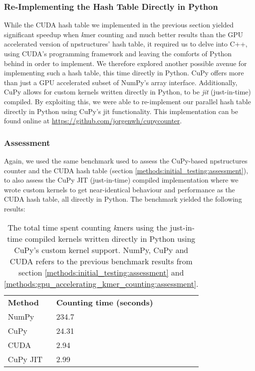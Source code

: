 \subsubsection{Re-Implementing the Hash Table Directly in Python} \label{methods:gpu_accelerating_kmer_counting_jit}
While the CUDA hash table we implemented in the previous section yielded significant speedup when \textit{k}mer counting and much better results than the GPU accelerated version of npstructures' hash table, it required us to delve into C++, using CUDA's programming framework and leaving the comforts of Python behind in order to implement.
We therefore explored another possible avenue for implementing such a hash table, this time directly in Python.
CuPy offers more than just a GPU accelerated subset of NumPy's array interface.
Additionally, CuPy allows for custom kernels written directly in Python, to be \textit{jit} (just-in-time) compiled.
By exploiting this, we were able to re-implement our parallel hash table directly in Python using CuPy's jit functionality.
This implementation can be found online at \url{https://github.com/jorgenwh/cupycounter}.

\subsubsection{Assessment}
Again, we used the same benchmark used to assess the CuPy-based npstructures counter and the CUDA hash table (section \ref{methods:initial_testing:assessment}), to also assess the CuPy JIT (just-in-time) compiled implementation where we wrote custom kernels to get near-identical behaviour and performance as the CUDA hash table, all directly in Python.
The benchmark yielded the following results:
\begin{table}[H]
\begin{center}
\begin{tabular}{lllll}
\multicolumn{1}{l|}{\textbf{Method}} & \multicolumn{1}{l}{\textbf{Counting time (seconds)}} &  \\ \cline{1-2}
\multicolumn{1}{l|}{NumPy} & \multicolumn{1}{l}{234.7} &  \\
\multicolumn{1}{l|}{CuPy} & \multicolumn{1}{l}{24.31} &  \\
\multicolumn{1}{l|}{CUDA} & \multicolumn{1}{l}{2.94} &  \\
\multicolumn{1}{l|}{CuPy JIT} & \multicolumn{1}{l}{2.99} &  \\
\end{tabular}
\end{center}
\caption{
  The total time spent counting \textit{k}mers using the just-in-time compiled kernels written directly in Python using CuPy's custom kernel support.
  NumPy, CuPy and CUDA refers to the previous benchmark results from section \ref{methods:initial_testing:assessment} and \ref{methods:gpu_accelerating_kmer_counting:assessment}.
}
\label{methods:gpu_accelerating_kmer_counting_jit:tables:benchmark}
\end{table}

